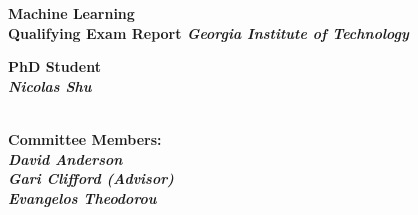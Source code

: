 \thispagestyle{empty}

\begin{center}
	\vfill
    \vspace*{0.2\textheight}

	\Huge
	\bf{Machine Learning \\Qualifying Exam Report}
	\it{Georgia Institute of Technology}
	\vskip 1cm

	\Large
	\bf{PhD Student} \\
	\it{Nicolas Shu} \\ \\
	\vskip 1cm


	\Large
	\bf{Committee Members:} \\
	\it{David Anderson} \\
	\it{Gari Clifford (Advisor)} \\
	\it{Evangelos Theodorou}

    \normalsize

\end{center}
